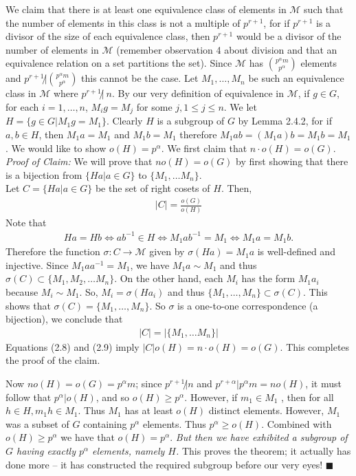 \begin{theorem}
We claim that there is at least one equivalence class of elements in $\mathcal{M}$ such that the number of elements in this class is not a multiple of $p^{r+1}$, for if $p^{r+1}$ is a divisor of the size of each equivalence class, then $p^{r+1}$ would be a divisor of the number of elements in $\mathcal{M}$ (remember observation 4 about division and that an equivalence relation on a set partitions the set). Since $\mathcal{M}$ has ${p^\alpha m \choose p^\alpha}$ elements and $p^{r+1} \not | {p^\alpha m \choose p^\alpha}$ this cannot be the case. Let ${M_1, \dots , M_n}$ be such an equivalence class in $\mathcal{M}$ where $p^{r+1}\not | \ n $. By our very definition of equivalence in $\mathcal{M}$, if $g \in G$, for each $i = 1, \dots , n$, $M_ig = M_j$ for some $j, 1 \leq j \leq n$. We let $H = \{g \in G | M_1g = M_1 \}$. Clearly $H$ is a subgroup of $G$ by Lemma 2.4.2, for if $a, b \in H$, then $M_1a = M_1 $ and $ M_1 b = M_1$ therefore $M_1ab = (M_1a)b = M_1b =M_1$. We would like to show $o(H)=p^\alpha$. We first claim that $n\cdot o(H) =o(G)$. \steezybreak\\
\textit{Proof of Claim:}
We will prove that $no(H)=o(G)$ by first showing that there is a bijection from $\{Ha | a \in G\}$ to $\{M_1,\dots M_n\}$. \steezybreak\\
Let $C= \{Ha|a\in G\}$ be the set of right cosets of $H$. Then,
\begin{align}
    |C| = \frac{o(G)}{o(H)} 
\end{align}
Note that
\begin{align}
    Ha=Hb \iff ab^{-1} \in H \iff M_1 ab^{-1} = M_1 \iff M_1a=M_1b .\nonumber
\end{align}
Therefore the function $\sigma:C\rightarrow \mathcal{M}$ given by $\sigma(Ha)=M_1 a$ is well-defined and injective. Since $M_1aa^{-1}=M_1$, we have $M_1a\sim M_1$ and thus $\sigma(C) \subset \{M_1,M_2,\dots M_n\}$. On the other hand, each $M_i$ has the form $M_1a_i$ because $M_i \sim M_1$. So, $M_i = \sigma(Ha_i)$ and thus $\{M_1, \dots, M_n\} \subset \sigma(C)$. This shows that $\sigma(C)= \{M_1, \dots , M_n\}$. So $\sigma$ is a one-to-one correspondence (a bijection), we conclude that
\begin{align}
    |C|=|\{M_1,\dots M_n\}|
\end{align}
Equations (2.8) and (2.9) imply $|C|o(H)=n\cdot o(H)=o(G)$. This completes the proof of the claim.

Now $no(H) = o(G) = p^\alpha m$; since $p^{r+1}\not | n$ and $p^{r+\alpha}|p^{\alpha}m = no(H)$, it must follow that $p^\alpha | o(H)$, and so $o(H)\geq p^\alpha$. However, if $m_1 \in M_1$ , then for all $h\in H, m_1h \in M_1$. Thus $M_1$ has at least $o(H)$ distinct elements. However, $M_1$ was a subset of $G$ containing $p^\alpha$ elements. Thus $p^\alpha \geq o(H)$. Combined with $o(H) \geq p^\alpha$ we have that $o(H) = p^\alpha$. \textit{But then we have exhibited a subgroup of $G$ having exactly $p^\alpha$ elements, namely $H$.} This proves the theorem; it actually has done more -- it has constructed the required subgroup before our very eyes! $\blacksquare$

\end{theorem}


